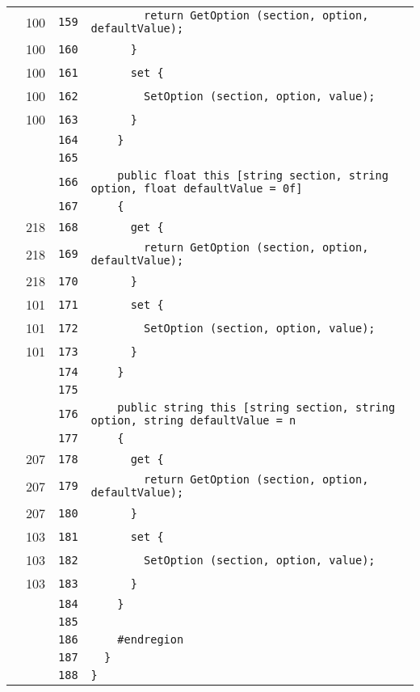 \documentclass[a4paper,10pt]{article}
\begin{document}
\begin{longtable}[l]{lrrl}
\cellcolor{green} & 100 & \verb~159~ & \verb~        return GetOption (section, option, defaultValue);~\\
\cellcolor{green} & 100 & \verb~160~ & \verb~      }~\\
\cellcolor{green} & 100 & \verb~161~ & \verb~      set {~\\
\cellcolor{green} & 100 & \verb~162~ & \verb~        SetOption (section, option, value);~\\
\cellcolor{green} & 100 & \verb~163~ & \verb~      }~\\
\cellcolor{gray} &  & \verb~164~ & \verb~    }~\\
\cellcolor{gray} &  & \verb~165~ & \verb~~\\
\cellcolor{gray} &  & \verb~166~ & \verb~    public float this [string section, string option, float defaultValue = 0f]~\\
\cellcolor{gray} &  & \verb~167~ & \verb~    {~\\
\cellcolor{green} & 218 & \verb~168~ & \verb~      get {~\\
\cellcolor{green} & 218 & \verb~169~ & \verb~        return GetOption (section, option, defaultValue);~\\
\cellcolor{green} & 218 & \verb~170~ & \verb~      }~\\
\cellcolor{green} & 101 & \verb~171~ & \verb~      set {~\\
\cellcolor{green} & 101 & \verb~172~ & \verb~        SetOption (section, option, value);~\\
\cellcolor{green} & 101 & \verb~173~ & \verb~      }~\\
\cellcolor{gray} &  & \verb~174~ & \verb~    }~\\
\cellcolor{gray} &  & \verb~175~ & \verb~~\\
\cellcolor{gray} &  & \verb~176~ & \verb~    public string this [string section, string option, string defaultValue = n~\\
\cellcolor{gray} &  & \verb~177~ & \verb~    {~\\
\cellcolor{green} & 207 & \verb~178~ & \verb~      get {~\\
\cellcolor{green} & 207 & \verb~179~ & \verb~        return GetOption (section, option, defaultValue);~\\
\cellcolor{green} & 207 & \verb~180~ & \verb~      }~\\
\cellcolor{green} & 103 & \verb~181~ & \verb~      set {~\\
\cellcolor{green} & 103 & \verb~182~ & \verb~        SetOption (section, option, value);~\\
\cellcolor{green} & 103 & \verb~183~ & \verb~      }~\\
\cellcolor{gray} &  & \verb~184~ & \verb~    }~\\
\cellcolor{gray} &  & \verb~185~ & \verb~~\\
\cellcolor{gray} &  & \verb~186~ & \verb~    #endregion~\\
\cellcolor{gray} &  & \verb~187~ & \verb~  }~\\
\cellcolor{gray} &  & \verb~188~ & \verb~}~\\
\end{longtable}
\newpage
\end{document}
